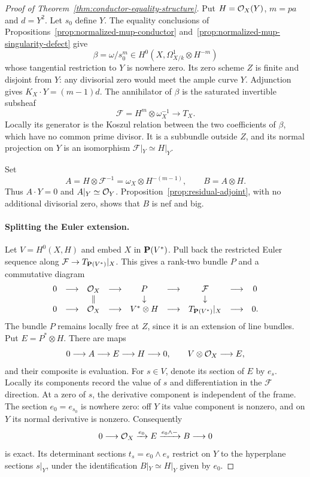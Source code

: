 \begin{proof}[Proof of Theorem~\ref{thm:conductor-equality-structure}]
Put $H=\mathcal O_X(Y)$, $m=pa$ and $d=Y^2$. Let $s_0$ define $Y$.
The equality conclusions of
Propositions~\ref{prop:normalized-mup-conductor}
and~\ref{prop:normalized-mup-singularity-defect} give
\[
 \beta=\omega/s_0^m\in H^0(X,\Omega^1_{X/k}\otimes H^{-m})
\]
whose tangential restriction to $Y$ is nowhere zero. Its zero scheme
$Z$ is finite and disjoint from $Y$: any divisorial zero would meet
the ample curve $Y$. Adjunction gives $K_X\cdot Y=(m-1)d$.
The annihilator of $\beta$ is the saturated invertible subsheaf
\[
 \mathcal F=H^m\otimes\omega_X^{-1}\longrightarrow T_X.
\]
Locally its generator is the Koszul relation between the two
coefficients of $\beta$, which have no common prime divisor.
It is a subbundle outside $Z$, and its normal projection on $Y$
is an isomorphism $\mathcal F|_Y\simeq H|_Y$.

Set
\[
 A=H\otimes\mathcal F^{-1}=\omega_X\otimes H^{-(m-1)},
 \qquad B=A\otimes H.
\]
Thus $A\cdot Y=0$ and $A|_Y\simeq\mathcal O_Y$.
Proposition~\ref{prop:residual-adjoint}, with no additional
divisorial zero, shows that $B$ is nef and big.

\paragraph{Splitting the Euler extension.}
Let $V=H^0(X,H)$ and embed $X$ in $\mathbf P(V^*)$. Pull back the
restricted Euler sequence along
$\mathcal F\to T_{\mathbf P(V^*)}|_X$. This gives a rank-two bundle
$P$ and a commutative diagram
\[
\begin{array}{ccccccccc}
0&\longrightarrow&\mathcal O_X&\longrightarrow&P&\longrightarrow&\mathcal F&\longrightarrow&0\\
&&\Vert&&\downarrow&&\downarrow\\
0&\longrightarrow&\mathcal O_X&\longrightarrow&V^*\otimes H&\longrightarrow&T_{\mathbf P(V^*)}|_X&\longrightarrow&0.
\end{array}
\]
The bundle $P$ remains locally free at $Z$, since it is an extension
of line bundles. Put $E=P^*\otimes H$. There are maps
\[
 0\longrightarrow A\longrightarrow E\longrightarrow H
 \longrightarrow0,\qquad V\otimes\mathcal O_X\longrightarrow E,
\]
and their composite is evaluation. For $s\in V$, denote its
section of $E$ by $e_s$. Locally its components record the value
of $s$ and differentiation in the $\mathcal F$ direction. At a
zero of $s$, the derivative component is independent of the frame.
The section $e_0=e_{s_0}$ is nowhere zero: off $Y$ its value
component is nonzero, and on $Y$ its normal derivative is nonzero.
Consequently
\begin{equation}\label{eq:conductor-euler-extension}
 0\longrightarrow\mathcal O_X\xrightarrow{e_0}E
 \xrightarrow{e_0\wedge-}B\longrightarrow0
\end{equation}
is exact. Its determinant sections $t_s=e_0\wedge e_s$ restrict
on $Y$ to the hyperplane sections $s|_Y$, under the identification
$B|_Y\simeq H|_Y$ given by $e_0$.


\end{proof}
